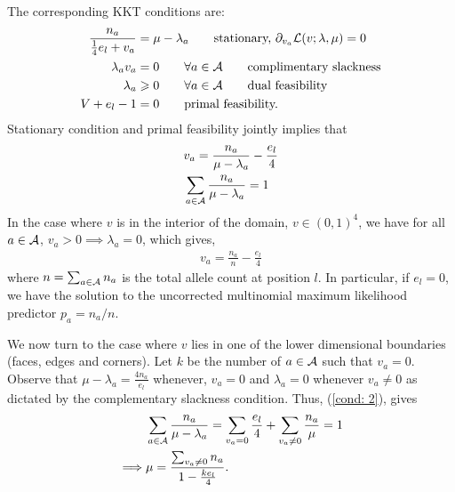 \documentclass{article}
\begin{document}
The corresponding KKT conditions are: 
\begin{align*}
\frac{n_a}{\frac{1}{4}e_l + v_a} &= \mu - \lambda_a \tag*{stationary, $\p_{v_a} \L(v; \lambda, \mu) = 0$}\\
\lambda_a v_a &= 0 \quad \quad \forall a \in \A \tag*{complimentary slackness}\\
\lambda_a &\geq 0 \quad \quad \forall a \in \A \tag*{dual feasibility } \\
V + e_l -1 &= 0 \tag*{primal feasibility.} \\  
\end{align*}
Stationary condition and primal feasibility jointly implies that 
\begin{align}
&v_a = \frac{n_a}{\mu - \lambda_a} - \frac{e_l}{4} \label{cond: 1}\\
&\sum_{a \in {\ensuremath {\cal A}}} \frac{n_a}{\mu - \lambda_a} = 1 \label{cond: 2}
\end{align}
In the case where $v$ is in the interior of the domain, $v \in (0, 1)^4$, we have for all $a \in {\ensuremath {\cal A}}$, $v_a > 0 \implies \lambda_a = 0$, which gives,
\begin{align*}
v_a = \frac{n_a}{n} - \frac{e_l}{4}
\end{align*}
where $n = \sum_{a \in {\ensuremath {\cal A}}} n_a$ is the total allele count at position $l$. In particular, if $e_l = 0$, we have the solution to the uncorrected multinomial maximum likelihood predictor $p_a = n_a / n$. 

We now turn to the case where $v$ lies in one of the lower dimensional boundaries (faces, edges and corners). Let $k$ be the number of $a \in {\ensuremath {\cal A}}$ such that $v_a = 0$. Observe that $\mu - \lambda_a = \frac{4n_a}{e_l}$ whenever, $v_a = 0$ and $\lambda_a = 0$ whenever $v_a \neq 0$ as dictated by the complementary slackness condition. Thus, (\ref{cond: 2}), gives
\begin{align*}
&\sum_{a \in {\ensuremath {\cal A}}} \frac{n_a}{\mu - \lambda_a} = \sum_{v_a = 0} \frac{e_l}{4} + \sum_{v_a \neq 0} \frac{n_a}{\mu}  = 1 \\
\implies& \mu = \frac{ \sum_{v_a \neq 0} n_a}{1 - \frac{ke_l}{4}}.
\end{align*}
\end{document}
